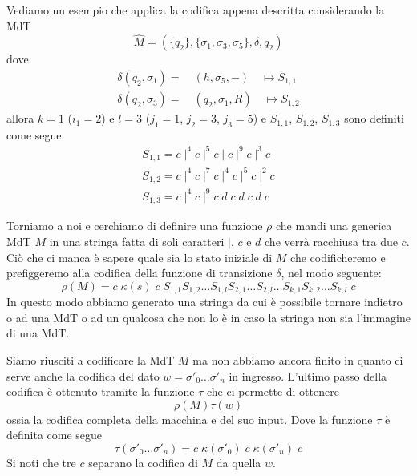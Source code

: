 \begin{example}
	Vediamo un esempio che applica la codifica appena descritta
	considerando la MdT
	\[
		\hat{M} = (\{ q_2 \}, \{ \sigma_1, \sigma_3, \sigma_5 \},
		\delta, q_2)
	\]
	dove
	\begin{gather*}
		\delta(q_2, \sigma_1) = \quad (h, \sigma_5, -)
		\quad \mapsto S_{1,1} \\
		\delta(q_2, \sigma_3) = \quad (q_2, \sigma_1, R)
		\quad \mapsto S_{1,2}
	\end{gather*}
	allora $k=1$ ($i_1=2$) e $l = 3$ ($j_1 = 1$, $j_2 = 3$,
	$j_3 = 5$) e $S_{1,1}$, $S_{1,2}$, $S_{1,3}$ sono definiti
	come segue
	\begin{gather*}
		S_{1,1} = c \mid^4 c \mid^5 c \mid c \mid^9 c \mid^3 c \\
		S_{1,2} = c \mid^4 c \mid^7 c \mid^4 c \mid^5 c \mid^2 c \\
		S_{1,3} = c \mid^4 c \mid^9 c \; d \; c \; d \; c \; d \; c
	\end{gather*}
\end{example}

Torniamo a noi e cerchiamo di definire una funzione $\rho$ che
mandi una generica MdT $M$ in una stringa fatta di soli caratteri
$\mid$, $c$ e $d$ che verrà racchiusa tra due $c$. Ciò che ci
manca è sapere quale sia lo stato iniziale di $M$ che
codificheremo e prefiggeremo alla codifica della funzione di
transizione $\delta$, nel modo seguente:
\[
	\rho (M) = c \; \kappa (s) \; c \;
	S_{1,1} S_{1,2} \dots
	S_{1,l} S_{2,1} \dots S_{2,l} \dots
	S_{k,1} S_{k,2} \dots S_{k,l} \; c
\]
In questo modo abbiamo generato una stringa da cui è possibile
tornare indietro o ad una MdT o ad un qualcosa che non lo è in
caso la stringa non sia l'immagine di una MdT.

Siamo riusciti a codificare la MdT $M$ ma non abbiamo ancora
finito in quanto ci serve anche la codifica del dato
$w = \sigma'_0 \dots \sigma'_n$ in ingresso. L'ultimo passo
della codifica è ottenuto tramite la funzione $\tau$ che ci
permette di ottenere
\[ \rho(M) \tau(w) \]
ossia la codifica completa della macchina e del suo input. Dove
la funzione $\tau$ è definita come segue
\[
	\tau(\sigma'_0 \dots \sigma'_n) =
	c \; \kappa(\sigma'_0) \;
	c \; \kappa(\sigma'_n) \; c
\]
Si noti che tre $c$ separano la codifica di $M$ da quella $w$.


